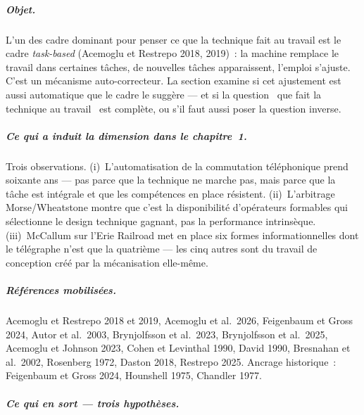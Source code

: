 \subparagraph{Objet.}
L'un des cadre dominant pour penser ce que la technique fait au travail est le cadre \emph{task-based} (Acemoglu et Restrepo 2018, 2019)~: la machine remplace le travail dans certaines t\^aches, de nouvelles t\^aches apparaissent, l'emploi s'ajuste. C'est un m\'ecanisme auto-correcteur. La section examine si cet ajustement est aussi automatique que le cadre le sugg\`ere --- et si la question \og~que fait la technique au travail~\fg{} est compl\`ete, ou s'il faut aussi poser la question inverse.

\subparagraph{Ce qui a induit la dimension dans le chapitre~1.}
Trois observations. (i)~L'automatisation de la commutation t\'el\'ephonique prend soixante ans --- pas parce que la technique ne marche pas, mais parce que la t\^ache est int\'egrale et que les comp\'etences en place r\'esistent. (ii)~L'arbitrage Morse/Wheatstone montre que c'est la disponibilit\'e d'op\'erateurs formables qui s\'electionne le design technique gagnant, pas la performance intrins\`eque. (iii)~McCallum sur l'Erie Railroad met en place six formes informationnelles dont le t\'el\'egraphe n'est que la quatri\`eme --- les cinq autres sont du travail de conception cr\'e\'e par la m\'ecanisation elle-m\^eme.

\subparagraph{R\'ef\'erences mobilis\'ees.}
Acemoglu et Restrepo 2018 et 2019, Acemoglu et al.\ 2026, Feigenbaum et Gross 2024, Autor et al.\ 2003, Brynjolfsson et al.\ 2023, Brynjolfsson et al.\ 2025, Acemoglu et Johnson 2023, Cohen et Levinthal 1990, David 1990, Bresnahan et al.\ 2002, Rosenberg 1972, Daston 2018, Restrepo 2025. Ancrage historique~: Feigenbaum et Gross 2024, Hounshell 1975, Chandler 1977.

\subparagraph{Ce qui en sort --- trois hypoth\`eses.}

